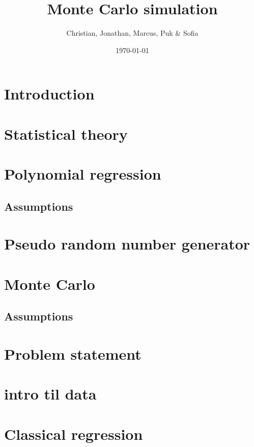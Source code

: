 \documentclass{article}
\title{Monte Carlo simulation}
\author{Christian, Jonathan, Marcus, Puk \& Sofia }
\date{\today}
\begin{document}
	
	
	\setcounter{section}{0}
	\maketitle
	\newpage
	\tableofcontents
	\newpage
	
	\section{Introduction}
	
	\newpage
	
	\section{Statistical theory}
	
	\newpage
	
	\section{Polynomial regression}
	\newpage
	
	\subsection{Assumptions}
	\newpage
	
	\section{Pseudo random number generator}
	
	\newpage
	
	\section{Monte Carlo}
	\subsection{Assumptions}
	\newpage
	
	\section{Problem statement}
	\newpage
	\section{intro til data}
	
	\newpage
	\section{Classical regression}
	\newpage
	
\end{document}

